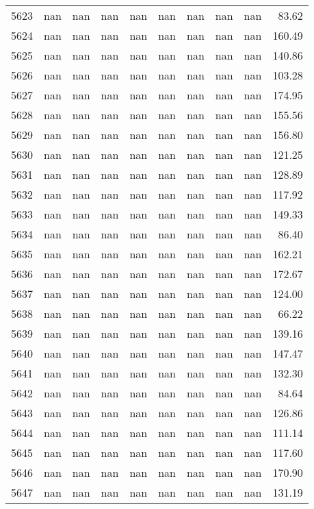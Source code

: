 \begin{tabular}{lrrrrrrrrr}
5623 & nan & nan & nan & nan & nan & nan & nan & nan & 83.62 \\
5624 & nan & nan & nan & nan & nan & nan & nan & nan & 160.49 \\
5625 & nan & nan & nan & nan & nan & nan & nan & nan & 140.86 \\
5626 & nan & nan & nan & nan & nan & nan & nan & nan & 103.28 \\
5627 & nan & nan & nan & nan & nan & nan & nan & nan & 174.95 \\
5628 & nan & nan & nan & nan & nan & nan & nan & nan & 155.56 \\
5629 & nan & nan & nan & nan & nan & nan & nan & nan & 156.80 \\
5630 & nan & nan & nan & nan & nan & nan & nan & nan & 121.25 \\
5631 & nan & nan & nan & nan & nan & nan & nan & nan & 128.89 \\
5632 & nan & nan & nan & nan & nan & nan & nan & nan & 117.92 \\
5633 & nan & nan & nan & nan & nan & nan & nan & nan & 149.33 \\
5634 & nan & nan & nan & nan & nan & nan & nan & nan & 86.40 \\
5635 & nan & nan & nan & nan & nan & nan & nan & nan & 162.21 \\
5636 & nan & nan & nan & nan & nan & nan & nan & nan & 172.67 \\
5637 & nan & nan & nan & nan & nan & nan & nan & nan & 124.00 \\
5638 & nan & nan & nan & nan & nan & nan & nan & nan & 66.22 \\
5639 & nan & nan & nan & nan & nan & nan & nan & nan & 139.16 \\
5640 & nan & nan & nan & nan & nan & nan & nan & nan & 147.47 \\
5641 & nan & nan & nan & nan & nan & nan & nan & nan & 132.30 \\
5642 & nan & nan & nan & nan & nan & nan & nan & nan & 84.64 \\
5643 & nan & nan & nan & nan & nan & nan & nan & nan & 126.86 \\
5644 & nan & nan & nan & nan & nan & nan & nan & nan & 111.14 \\
5645 & nan & nan & nan & nan & nan & nan & nan & nan & 117.60 \\
5646 & nan & nan & nan & nan & nan & nan & nan & nan & 170.90 \\
5647 & nan & nan & nan & nan & nan & nan & nan & nan & 131.19 \\

\end{tabular}
